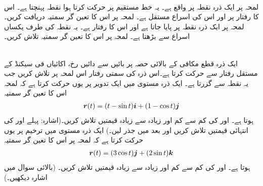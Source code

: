 \\
لمحہ  پر ایک ذرہ نقطہ  پر واقع ہے۔ یہ خط مستقیم پر حرکت کرتا ہوا نقطہ  پہنچتا ہے۔ اس کا رفتار  پر  اور  اس کی اسراع مستقل  ہے۔ لمحہ  پر اس کا تعین گر سمتیہ  دریافت کریں۔
لمحہ  پر ایک ذرہ نقطہ  پر پایا جاتا ہے  اور  اس کا رفتار  ہے۔ یہ نقطہ  کی طرف یکساں اسراع  سے بڑھتا ہے۔ لمحہ  پر اس کا تعین گر سمتیہ  تلاش کریں۔

\\
ایک ذرہ قطع مکافی  کے بالائی حصہ پر بائیں سے دائیں رخ،  اکائیاں فی سیکنڈ کے  مستقل رفتار   سے  حرکت کرتا ہے۔اس ذرہ کی سمتی رفتار اس لمحہ  پر تلاش کریں جب یہ نقطہ  سے گزرتا ہے۔
ایک ذرہ  مستوی  میں ایک  تدویر پر یوں حرکت کرتا ہے کہ لمحہ  اس کا تعین گر سمتیہ 
\begin{align*}
{\ensuremath{{\boldsymbol{r}}}}(t)=(t-\sin t){\boldsymbol{i}}+(1-\cos t){\boldsymbol{j}}
\end{align*}
ہوتا ہے۔  اور  کی کم سے کم اور زیادہ سے زیادہ قیمتیں تلاش کریں۔(اشارہ: پہلے  اور  کی انتہائی قیمتیں تلاش کریں اور بعد میں جذر لیں۔)
ایک ذرہ  مستوی  میں ترخیم  پر یوں  حرکت  کرتا ہے کہ لمحہ  پر اس کا  تعین گر سمتیہ 
\begin{align*}
{\ensuremath{{\boldsymbol{r}}}}(t)=(3\cos t){\boldsymbol{j}}+(2\sin t){\boldsymbol{k}}
\end{align*}
ہوتا ہے۔  اور  کی کم سے کم اور زیادہ سے زیادہ قیمتیں تلاش کریں۔ (بالائی سوال میں اشارہ  دیکھیں۔)


